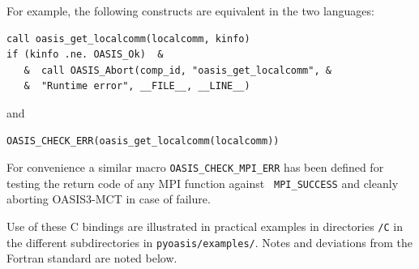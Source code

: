 For example, the following constructs are equivalent in the two languages:

\begin{verbatim}
call oasis_get_localcomm(localcomm, kinfo)
if (kinfo .ne. OASIS_Ok)  &
   &  call OASIS_Abort(comp_id, "oasis_get_localcomm", &
   &  "Runtime error", __FILE__, __LINE__)
\end{verbatim}

and

\begin{verbatim}
OASIS_CHECK_ERR(oasis_get_localcomm(localcomm))
\end{verbatim}

For convenience a similar macro {\tt OASIS\_CHECK\_MPI\_ERR} has been
defined for testing the return code of any MPI function against {\tt
  MPI\_SUCCESS} and cleanly aborting OASIS3-MCT in case of failure.

\vspace{0.2cm}
Use of these C bindings are illustrated in practical examples in
directories {\tt /C} in the different subdirectories in {\tt pyoasis/examples/}. Notes and deviations from
the Fortran standard are noted below.

